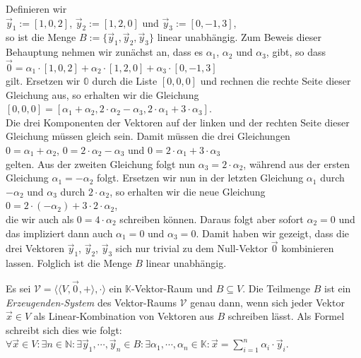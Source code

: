 \example
Definieren wir
\\[0.2cm]
\hspace*{1.3cm}
$\vec{y}_1 := [1, 0, 2]$, \quad  $\vec{y}_2 := [1, 2, 0]$ \quad und \quad $\vec{y}_3 := [0, -1, 3]$,
\\[0.2cm]
so ist die Menge $B := \{ \vec{y}_1, \vec{y}_2, \vec{y}_3 \}$
linear unabh\"{a}ngig.  Zum Beweis dieser Behauptung nehmen wir zun\"{a}chst an, dass es $\alpha_1$,
$\alpha_2$ und $\alpha_3$, gibt, so dass
\\[0.2cm]
\hspace*{1.3cm}
$\vec{0} = \alpha_1 \cdot [1,0,2] + \alpha_2 \cdot [1,2,0] + \alpha_3 \cdot [0,-1,3]$
\\[0.2cm]
gilt.  Ersetzen wir $\mathbb{0}$ durch die Liste $[0,0,0]$ und rechnen die rechte Seite
dieser Gleichung aus, so erhalten wir die Gleichung
\\[0.2cm]
\hspace*{1.3cm}
$[0,0,0] = [\alpha_1  + \alpha_2, 2 \cdot \alpha_2 - \alpha_3, 2 \cdot \alpha_1 + 3 \cdot \alpha_3]$.
\\[0.2cm]
Die drei Komponenten der Vektoren auf der linken und der rechten Seite dieser Gleichung m\"{u}ssen
gleich sein.  Damit m\"{u}ssen die drei Gleichungen
\\[0.2cm]
\hspace*{1.3cm}
$0 = \alpha_1 + \alpha_2$, \quad $0 = 2 \cdot \alpha_2 - \alpha_3$ \quad und \quad $0 = 2 \cdot \alpha_1 + 3 \cdot \alpha_3$
\\[0.2cm]
gelten.  Aus der zweiten Gleichung folgt nun $\alpha_3 = 2 \cdot \alpha_2$, w\"{a}hrend aus der ersten
Gleichung $\alpha_1 = - \alpha_2$ folgt.  Ersetzen wir nun in der letzten Gleichung 
$\alpha_1$ durch $-\alpha_2$ und $\alpha_3$ durch $2 \cdot \alpha_2$, so erhalten wir die neue Gleichung
\\[0.2cm]
\hspace*{1.3cm}
$0 = 2 \cdot (- \alpha_2) + 3 \cdot 2 \cdot \alpha_2$,
\\[0.2cm]
die wir auch als $0 = 4 \cdot \alpha_2$ schreiben k\"{o}nnen.  Daraus folgt aber sofort $\alpha_2 = 0$
und das impliziert dann auch $\alpha_1 = 0$ und $\alpha_3 = 0$.  Damit haben wir gezeigt, dass die drei
Vektoren $\vec{y}_1$, $\vec{y}_2$, $\vec{y}_3$ sich nur trivial zu dem Null-Vektor
$\vec{0}$ kombinieren lassen.  Folglich ist die Menge $B$ linear unabh\"{a}ngig.
\eox

\begin{Definition}
  Es sei $\mathcal{V} = \bigl\langle \langle V, \vec{0}, + \rangle, \cdot \bigr\rangle$ ein $\mathbb{K}$-Vektor-Raum 
  und $B \subseteq V$.  Die Teilmenge $B$ ist ein
  \emph{Erzeugenden-System} des Vektor-Raums $\mathcal{V}$ genau dann, wenn sich jeder Vektor 
  $\vec{x} \in V$ als Linear-Kombination von Vektoren aus $B$ schreiben l\"{a}sst. 
  Als Formel schreibt sich dies wie folgt:
  \\[0.2cm]
  \hspace*{1.3cm}
  $\forall \vec{x} \in V: \exists n \in \mathbb{N}: \exists  \vec{y}_1, \cdots,
  \vec{y}_n \in B: \exists \alpha_1, \cdots, \alpha_n \in \mathbb{K}: 
  \vec{x} = \sum\limits_{i=1}^n \alpha_i \cdot \vec{y}_i
  $. \eoxs
\end{Definition}

